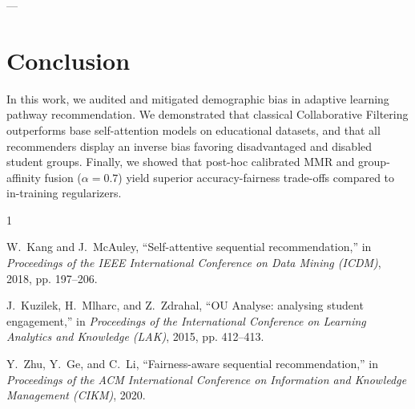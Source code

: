 \documentclass[10pt,journal,compsoc]{IEEEtran}
\begin{document}
---

\section{Conclusion}
In this work, we audited and mitigated demographic bias in adaptive learning pathway recommendation. We demonstrated that classical Collaborative Filtering outperforms base self-attention models on educational datasets, and that all recommenders display an inverse bias favoring disadvantaged and disabled student groups. Finally, we showed that post-hoc calibrated MMR and group-affinity fusion ($\alpha=0.7$) yield superior accuracy-fairness trade-offs compared to in-training regularizers.

\begin{thebibliography}{1}

W.~Kang and J.~McAuley, ``Self-attentive sequential recommendation,'' in \emph{Proceedings of the IEEE International Conference on Data Mining (ICDM)}, 2018, pp. 197--206.

J.~Kuzilek, H.~Mlharc, and Z.~Zdrahal, ``OU Analyse: analysing student engagement,'' in \emph{Proceedings of the International Conference on Learning Analytics and Knowledge (LAK)}, 2015, pp. 412--413.

Y.~Zhu, Y.~Ge, and C.~Li, ``Fairness-aware sequential recommendation,'' in \emph{Proceedings of the ACM International Conference on Information and Knowledge Management (CIKM)}, 2020.

\end{thebibliography}
\end{document}
